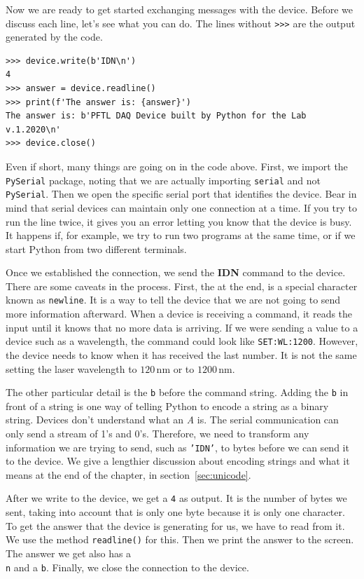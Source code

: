Now we are ready to get started exchanging messages with the device. Before we discuss each line, let's see what you can do. The lines without \texttt{>>>} are the output generated by the code.

\begin{verbatim}
>>> device.write(b'IDN\n')
4
>>> answer = device.readline()
>>> print(f'The answer is: {answer}')
The answer is: b'PFTL DAQ Device built by Python for the Lab v.1.2020\n'
>>> device.close()
\end{verbatim}

Even if short, many things are going on in the code above. First, we import the \texttt{PySerial} package, noting that we are actually importing \texttt{serial} and not \texttt{PySerial}. Then we open the specific serial port that identifies the device. Bear in mind that serial devices can maintain only one connection at a time. If you try to run the line twice, it gives you an error letting you know that the device is busy. It happens if, for example, we try to run two programs at the same time, or if we start Python from two different terminals.

Once we established the connection, we send the \textbf{{IDN}} command to the device. There are some caveats in the process. First, the \texttt{\n} at the end, is a special character known as \texttt{newline}. It is a way to tell the device that we are
not going to send more information afterward. When a device is receiving a command, it reads the input until it knows that no more data is arriving. If we were sending a value to a device such as a wavelength, the command could look like \texttt{SET:WL:1200}. However, the device needs to know when it has received the last number. It is not the same setting the laser wavelength to $120\,\textrm{nm}$ or to $1200\,\textrm{nm}$.

The other particular detail is the \texttt{b} before the command string. Adding the \texttt{b} in front of a string is one way of telling Python to encode a string as a binary string. Devices don't understand what an \textit{A} is. The serial communication can only send a stream of 1's and 0's. Therefore, we need to transform any information we are trying to send, such as \texttt{'IDN'}, to bytes before we can send it to the device. We give a lengthier discussion about encoding strings and what it means at the end of the chapter, in section~\ref{sec:unicode}.

After we write to the device, we get a \texttt{4} as output. It is the number of bytes we sent, taking into account that \texttt{\n} is only one byte because it is only one character. To get the answer that the device is generating for us, we have to read from it. We use the method \texttt{readline()} for this. Then we print the answer to the screen. The answer we get also has a \texttt{\\n} and a \texttt{b}. Finally, we close the connection to the device.

